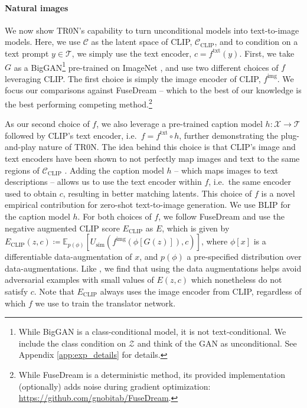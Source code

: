 \documentclass[nohyperref]{article}
\theoremstyle{plain}
\theoremstyle{definition}
\theoremstyle{remark}
\begin{document}
\paragraph{Natural images} We now show TR0N's capability to turn unconditional models into text-to-image models. Here, we use $\mathcal{C}$ as the latent space of CLIP, $\mathcal{C}_\text{CLIP}$, and to condition on a text prompt $y \in \mathcal{T}$, we simply use the text encoder, $c = f^{\text{txt}}(y)$. First, we take $G$ as a BigGAN\footnote{While BigGAN is a class-conditional model, it is not text-conditional. We include the class condition on $\mathcal{Z}$ and think of the GAN as unconditional. See Appendix \ref{app:exp_details} for details.} \citep{brock2018large} pre-trained on ImageNet \citep{deng2009imagenet}, and use two different choices of $f$ leveraging CLIP. The first choice is simply the image encoder of CLIP, $f^{\text{img}}$. We focus our comparisons against FuseDream -- which to the best of our knowledge is the best performing competing method.\footnote{While FuseDream is a deterministic method, its provided implementation (optionally) adds noise during gradient optimization: \url{https://github.com/gnobitab/FuseDream}.}

As our second choice of $f$, we also leverage a pre-trained caption model $h:\mathcal{X} \rightarrow \mathcal{T}$ followed by CLIP's text encoder, i.e.\ $f=f^{\text{txt}} \circ h$, further demonstrating the plug-and-play nature of TR0N. The idea behind this choice is that CLIP's image and text encoders have been shown to not perfectly map images and text to the same regions of $\mathcal{C}_\text{CLIP}$ \citep{liang2022mind}. Adding the caption model $h$ -- which maps images to text descriptions -- allows us to use the text encoder within $f$, i.e.\ the same encoder used to obtain $c$, resulting in better matching latents. This choice of $f$ is a novel empirical contribution for zero-shot text-to-image generation. We use BLIP \citep{li2022blip} for the caption model $h$. For both choices of $f$, we follow FuseDream and use the negative augmented CLIP score $E_{\text{CLIP}}$ as $E$, which is given by $E_{\text{CLIP}}(z, c) \coloneqq \mathbb{E}_{p(\phi)}[U_{\text{sim}}(f^{\text{img}}(\phi[G(z)]), c)]$, where $\phi[x]$ is a differentiable data-augmentation \citep{zhao2020differentiable} of $x$, and $p(\phi)$ a pre-specified distribution over data-augmentations. Like \citet{liu2021fusedream}, we find that using the data augmentations helps avoid adversarial examples with small values of $E(z,c)$ which nonetheless do not satisfy $c$. Note that $E_{\text{CLIP}}$ always uses the image encoder from CLIP, regardless of which $f$ we use to train the translator network. 
\end{document}
